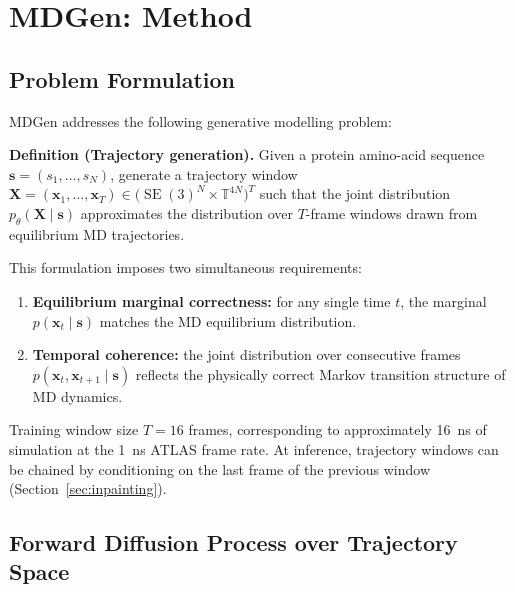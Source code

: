 \documentclass[11pt,a4paper]{article}
\DeclareMathOperator{\SE}{SE}
\newcommand{\bx}{\mathbf{x}}
\newcommand{\bX}{\mathbf{X}}
\newcommand{\bs}{\mathbf{s}}
\newcommand{\TT}{\mathbb{T}}
\begin{document}
\section{MDGen: Method}
\label{sec:mdgen}

\subsection{Problem Formulation}

MDGen addresses the following generative modelling problem:

\begin{calloutbox}
  \textbf{Definition (Trajectory generation).}  Given a protein amino-acid sequence
  $\bs = (s_1, \ldots, s_N)$, generate a trajectory window
  $\bX = (\bx_1, \ldots, \bx_T) \in \bigl(\SE(3)^N \times \TT^{4N}\bigr)^T$ such that the joint
  distribution $p_\theta(\bX \mid \bs)$ approximates the distribution over $T$-frame windows drawn
  from equilibrium MD trajectories.
\end{calloutbox}

This formulation imposes two simultaneous requirements:
\begin{enumerate}[leftmargin=2em]
  \item \textbf{Equilibrium marginal correctness:} for any single time $t$, the marginal
    $p(\bx_t \mid \bs)$ matches the MD equilibrium distribution.
  \item \textbf{Temporal coherence:} the joint distribution over consecutive frames
    $p(\bx_t, \bx_{t+1} \mid \bs)$ reflects the physically correct Markov transition structure
    of MD dynamics.
\end{enumerate}

Training window size $T = 16$ frames, corresponding to approximately 16~ns of simulation at the
1~ns ATLAS frame rate.  At inference, trajectory windows can be chained by conditioning on the
last frame of the previous window (Section~\ref{sec:inpainting}).

\subsection{Forward Diffusion Process over Trajectory Space}
\label{sec:forward}
\end{document}
